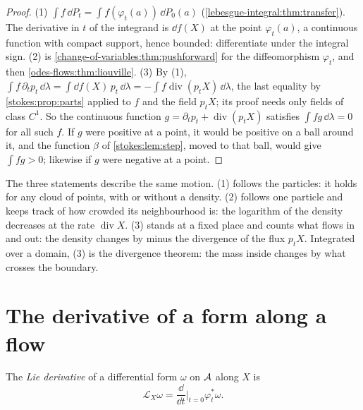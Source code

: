 \begin{notechapter}
\begin{proof}
(1) $\int f\,\dd P_t = \int f(\varphi_t(a))\,\dd P_0(a)$
(\cref{lebesgue-integral:thm:transfer}). The derivative in $t$ of the
integrand is $\dd f(X)$ at the point $\varphi_t(a)$, a continuous
function with compact support, hence bounded: differentiate under the
integral sign. (2) is \cref{change-of-variables:thm:pushforward} for
the diffeomorphism $\varphi_t$, and then
\cref{odes-flows:thm:liouville}. (3) By (1),
$\int f\,\partial_tp_t\,\dd\lambda
= \int\dd f(X)\,p_t\,\dd\lambda
= -\int f\operatorname{div}(p_tX)\,\dd\lambda$, the last equality by
\cref{stokes:prop:parts} applied to $f$ and the field $p_tX$; its
proof needs only fields of class $C^1$. So the
continuous function $g = \partial_tp_t + \operatorname{div}(p_tX)$
satisfies $\int fg\,\dd\lambda = 0$ for all such $f$. If $g$ were
positive at a point, it would be positive on a ball around it, and
the function $\beta$ of \cref{stokes:lem:step}, moved to that ball,
would give $\int fg > 0$; likewise if $g$ were negative at a point.
\end{proof}

\begin{intuition}
The three statements describe the same motion. (1) follows the
particles: it holds for any cloud of points, with or without a
density. (2) follows one particle and keeps track of how crowded its
neighbourhood is: the logarithm of the density decreases at the rate
$\operatorname{div}X$. (3) stands at a fixed place and counts what
flows in and out: the density changes by minus the divergence of the
flux $p_tX$. Integrated over a domain, (3) is the divergence theorem:
the mass inside changes by what crosses the boundary.
\end{intuition}

\section{The derivative of a form along a flow}
\label{odes-flows:sec:lie}

\begin{definition}\label{odes-flows:def:lie}
The \emph{Lie derivative} of a differential form $\omega$ on $\mathcal{A}$
along $X$ is
\[
  \mathcal L_X\omega
  = \frac{\dd}{\dd t}\Big|_{t=0}\varphi_t^*\omega .
\]
\end{definition}


\end{notechapter}
